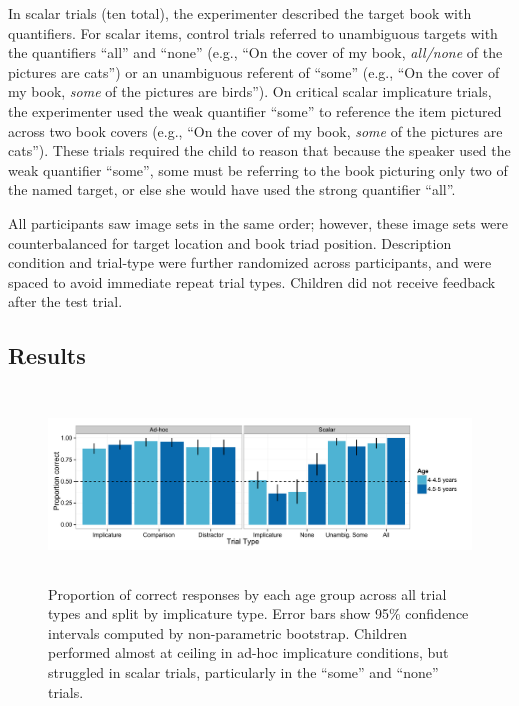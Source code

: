 \documentclass[man]{apa2}
\begin{document}
In scalar trials (ten total), the experimenter described the target book with quantifiers. For scalar items, control trials referred to unambiguous targets with the quantifiers ``all'' and ``none'' (e.g., ``On the cover of my book, \textit{all/none} of the pictures are cats'') or an unambiguous referent of ``some'' (e.g., ``On the cover of my book, \textit{some} of the pictures are birds''). On critical scalar implicature trials, the experimenter used the weak quantifier ``some'' to reference the item pictured across two book covers (e.g., ``On the cover of my book, \textit{some} of the pictures are cats''). These trials required the child to reason that because the speaker used the weak quantifier ``some'', some must be referring to the book picturing only two of the named target, or else she would have used the strong quantifier ``all''. 

All participants saw image sets in the same order; however, these image sets were counterbalanced for target location and book triad position. Description condition and trial-type were further randomized across participants, and were spaced to avoid immediate repeat trial types. Children did not receive feedback after the test trial.

\subsection{Results}


\begin{figure} 
 \begin{center} 
  \includegraphics[height=2in]{figures/exp1_performance.pdf} 
  \caption{\label{fig:exp1_perf} Proportion of correct responses by each age group across all trial types and split by implicature type. Error bars show 95\% confidence intervals computed by non-parametric bootstrap. Children performed almost at ceiling in ad-hoc implicature conditions, but struggled in scalar trials, particularly in the ``some'' and ``none'' trials.} 
 \end{center} 
\end{figure}
\end{document}
